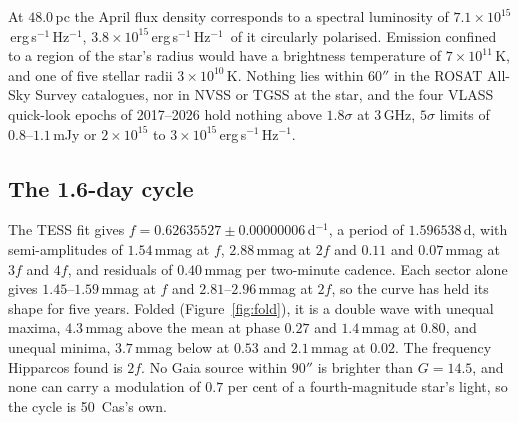 \documentclass[3p,11pt]{elsarticle}
\newcommand{\lnu}{erg\,s$^{-1}$\,Hz$^{-1}$}
\newcommand{\sci}[2]{#1\times10^{#2}}
\begin{document}
At $48.0$\,pc the April flux density corresponds to a spectral luminosity of
$\sci{7.1}{15}$\,\lnu, $\sci{3.8}{15}$\,\lnu\ of it circularly polarised. Emission
confined to a region of the star's radius would have a brightness temperature of
$\sci{7}{11}$\,K, and one of five stellar radii $\sci{3}{10}$\,K. Nothing lies within
$60''$ in the ROSAT All-Sky Survey catalogues, nor in NVSS or TGSS at the star, and the
four VLASS quick-look epochs of 2017--2026 hold nothing above $1.8\sigma$ at $3$\,GHz,
$5\sigma$ limits of $0.8$--$1.1$\,mJy or $\sci{2}{15}$ to $\sci{3}{15}$\,\lnu.

\subsection{The 1.6-day cycle}

The TESS fit gives $f=0.62635527\pm0.00000006$\,d$^{-1}$, a period of $1.596538$\,d,
with semi-amplitudes of $1.54$\,mmag at $f$, $2.88$\,mmag at $2f$ and $0.11$ and
$0.07$\,mmag at $3f$ and $4f$, and residuals of $0.40$\,mmag per two-minute cadence. Each
sector alone gives $1.45$--$1.59$\,mmag at $f$ and $2.81$--$2.96$\,mmag at $2f$, so the
curve has held its shape for five years. Folded (Figure~\ref{fig:fold}), it is a double
wave with unequal maxima, $4.3$\,mmag above the mean at phase $0.27$ and $1.4$\,mmag at
$0.80$, and unequal minima, $3.7$\,mmag below at $0.53$ and $2.1$\,mmag at $0.02$. The
frequency Hipparcos found is $2f$. No Gaia source within $90''$ is brighter than
$G=14.5$, and none can carry a modulation of $0.7$ per cent of a fourth-magnitude
star's light, so the cycle is 50~Cas's own.
\end{document}
